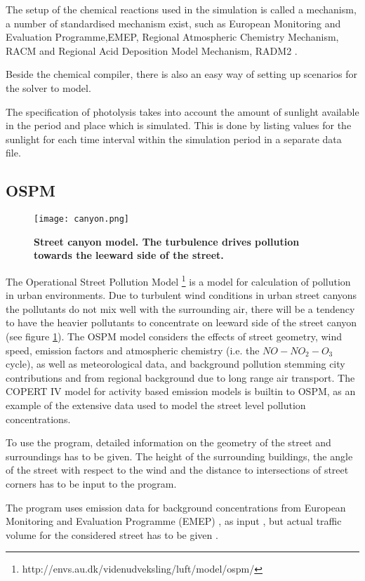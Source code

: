 The setup of the chemical reactions used in the simulation is called a mechanism, a number of standardised mechanism exist, such as European Monitoring and Evaluation Programme,EMEP, Regional Atmospheric Chemistry Mechanism, RACM and Regional Acid Deposition Model Mechanism, RADM2 \cite{Gross2003}.

Beside the chemical compiler, there is also an easy way of setting up scenarios for the solver to model. 

The specification of photolysis takes into account the amount of sunlight available in the period and place which is simulated. This is done by listing values for the sunlight for each time interval within the simulation period in a separate data file.

\subsection{OSPM}
\begin{figure}[!ht]
\begin{center}
\texttt{[image: canyon.png]}
\caption{{\bf Street canyon model. The turbulence drives pollution towards the leeward side of the street\protect\footnotemark.}}
\label{canyon}
\end{center}
\end{figure}

The Operational Street Pollution Model \footnote{http://envs.au.dk/videnudveksling/luft/model/ospm/} is a model for calculation of pollution in urban environments. Due to turbulent wind conditions in urban street canyons the pollutants do not mix well with the surrounding air, there will be a tendency to have the heavier pollutants to concentrate on leeward side of the street canyon (see figure \ref{canyon}). The OSPM model considers the effects of street geometry, wind speed, emission factors and atmospheric chemistry (i.e. the $NO - NO_2 - O_3$ cycle), as well as meteorological data, and background pollution stemming city contributions and from regional background due to long range air transport. The COPERT IV model for activity based emission models is builtin to OSPM, as an example of the extensive data used to model the street level pollution concentrations.

To use the program, detailed information on the geometry of the street and surroundings has to be given. The height of the surrounding buildings, the angle of the street with respect to the wind and the distance to intersections of street corners has to be input to the program.

The program uses emission data for background concentrations from European Monitoring and Evaluation Programme (EMEP) , as input , but actual traffic volume for the considered street has to be given \cite{berkowicz2000ospm}.




